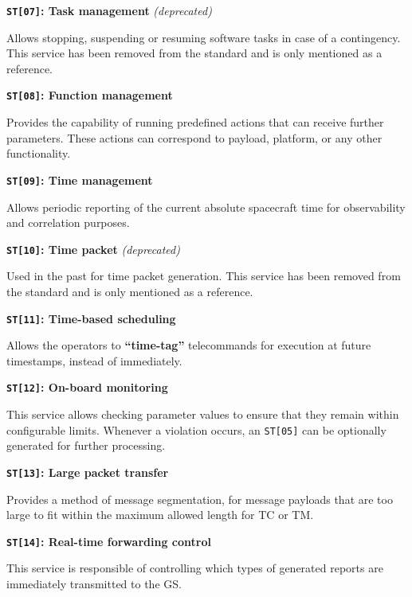 \documentclass[a4paper,nobib]{tufte-book}
\begin{document}
\begin{compactitem}
	\item \textbf{\texttt{ST[07]}: Task management} \emph{(deprecated)}
	
	Allows stopping, suspending or resuming software tasks in case of a contingency. This service has been removed from the standard and is only mentioned as a reference.
	
	\item \textbf{\texttt{ST[08]}: Function management}
	
	Provides the capability of running predefined actions that can receive further parameters. These actions can correspond to payload, platform, or any other functionality.
	
	\item \textbf{\texttt{ST[09]}: Time management}
	
	Allows periodic reporting of the current absolute spacecraft time for observability and correlation purposes.
	
	\item \textbf{\texttt{ST[10]}: Time packet} \emph{(deprecated)}
	
	Used in the past for time packet generation. This service has been removed from the standard and is only mentioned as a reference.
	
	\item \textbf{\texttt{ST[11]}: Time-based scheduling}
	
	Allows the operators to \textbf{``time-tag''} telecommands for execution at future timestamps, instead of immediately.
	
	\item \textbf{\texttt{ST[12]}: On-board monitoring}
	
	This service allows checking parameter values to ensure that they remain within configurable limits. Whenever a violation occurs, an \texttt{ST[05]} can be optionally generated for further processing.
	
	\item \textbf{\texttt{ST[13]}: Large packet transfer}
	
	Provides a method of message segmentation, for message payloads that are too large to fit within the maximum allowed length for \ac{TC} or \ac{TM}.
	
	\item \textbf{\texttt{ST[14]}: Real-time forwarding control}
	
	This service is responsible of controlling which types of generated reports are immediately transmitted to the \acl{GS}.
	

\end{compactitem}
\end{document}
